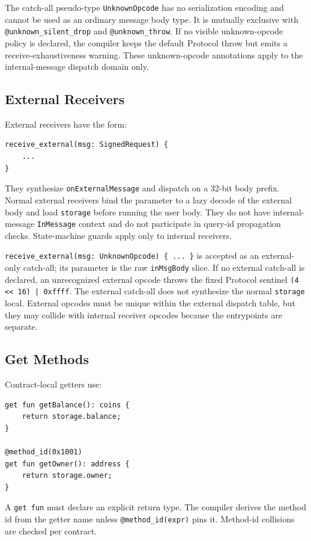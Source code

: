 \documentclass[12pt,oneside]{article}
\begin{document}
The catch-all pseudo-type \verb|UnknownOpcode| has no serialization encoding
and cannot be used as an ordinary message body type. It is mutually exclusive
with \verb|@unknown_silent_drop| and \verb|@unknown_throw|. If no visible
unknown-opcode policy is declared, the compiler keeps the default Protocol
throw but emits a receive-exhaustiveness warning. These unknown-opcode
annotations apply to the internal-message dispatch domain only.

\subsection{External Receivers}
External receivers have the form:

\begin{verbatim}
receive_external(msg: SignedRequest) {
    ...
}
\end{verbatim}

They synthesize \verb|onExternalMessage| and dispatch on a 32-bit body prefix.
Normal external receivers bind the parameter to a lazy decode of the external
body and load \verb|storage| before running the user body. They do not have
internal-message \verb|InMessage| context and do not participate in query-id
propagation checks. State-machine guards apply only to internal receivers.

\verb|receive_external(msg: UnknownOpcode) { ... }| is accepted as an
external-only catch-all; its parameter is the raw \verb|inMsgBody| slice. If no
external catch-all is declared, an unrecognized external opcode throws the
fixed Protocol sentinel \verb!(4 << 16) | 0xffff!. The external catch-all does
not synthesize the normal \verb|storage| local. External opcodes must be unique
within the external dispatch table, but they may collide with internal receiver
opcodes because the entrypoints are separate.

\subsection{Get Methods}
Contract-local getters use:

\begin{verbatim}
get fun getBalance(): coins {
    return storage.balance;
}

@method_id(0x1001)
get fun getOwner(): address {
    return storage.owner;
}
\end{verbatim}

A \verb|get fun| must declare an explicit return type. The compiler derives the
method id from the getter name unless \verb|@method_id(expr)| pins it.
Method-id collisions are checked per contract.
\end{document}
